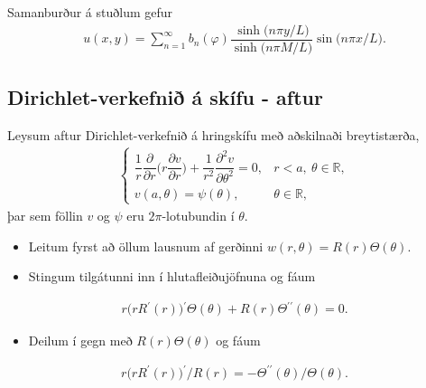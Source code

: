\documentclass[a4paper,10pt,icelandic]{sphinxmanual}
\begin{document}
Samanburður á stuðlum gefur
\begin{equation*}
\begin{split}u(x,y)=\sum_{n=1}^\infty
 b_n(\varphi)\dfrac{\sinh\big(n\pi y/L\big)}{\sinh\big(n\pi
 M/L\big)} \sin\big(n\pi x/L\big).\end{split}
\end{equation*}

\subsection{Dirichlet-verkefnið á skífu - aftur}
\label{\detokenize{Kafli03:dirichlet-verkefni-a-skifu-aftur}}
Leysum aftur Dirichlet-verkefnið á hringskífu með aðskilnaði breytistærða,
\begin{equation*}
\begin{split}\begin{cases}
 \dfrac 1r\dfrac{\partial}{\partial r}
 \bigg(r\dfrac{\partial v}{\partial r}\bigg)
 +\dfrac 1{r^2}\dfrac{\partial^2 v}{\partial\theta^2}=0, &r<a,
 \ {\theta}\in {{\mathbb  R}},\\
 v(a,\theta)={\psi}(\theta), &{\theta}\in {{\mathbb  R}},
 \end{cases}\end{split}
\end{equation*}
þar sem föllin \(v\) og \(\psi\) eru \(2\pi\)-lotubundin í
\(\theta\).
\begin{itemize}
\item {} 
Leitum fyrst að öllum lausnum af gerðinni \(w(r,\theta)=R(r)\Theta(\theta)\).

\item {} 
Stingum tilgátunni inn í hlutafleiðujöfnuna og fáum

\end{itemize}
\begin{equation*}
\begin{split}r \big(r R{{^{\prime}}}(r)\big){{^{\prime}}}\Theta(\theta)
 +R(r)\Theta{{^{\prime\prime}}}(\theta)=0.\end{split}
\end{equation*}\begin{itemize}
\item {} 
Deilum í gegn með \(R(r)\Theta(\theta)\) og fáum

\end{itemize}
\begin{equation*}
\begin{split}r\big(r R{{^{\prime}}}(r)\big){{^{\prime}}}/R(r)
 =-\Theta {{^{\prime\prime}}}(\theta)/\Theta (\theta).\end{split}
\end{equation*}
\end{document}
